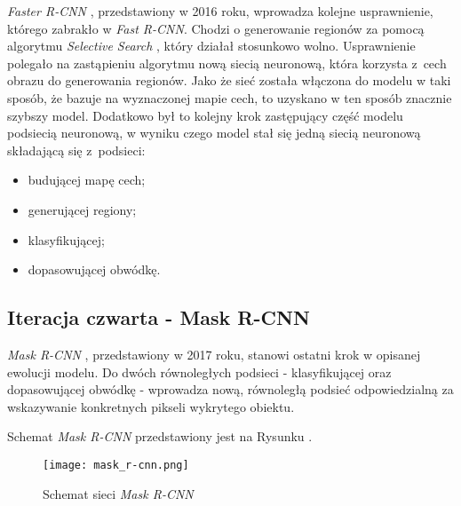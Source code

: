 
\textit{Faster R-CNN} \cite{faster-rcnn}, przedstawiony w 2016 roku, wprowadza kolejne usprawnienie, którego zabrakło w \textit{Fast R-CNN}.
Chodzi o generowanie regionów za pomocą algorytmu \textit{Selective Search} \cite{selective-search}, który działał stosunkowo wolno.
Usprawnienie polegało na zastąpieniu algorytmu nową siecią neuronową, która korzysta z~cech obrazu do generowania regionów.
Jako że sieć została włączona do modelu w taki sposób, że bazuje na wyznaczonej mapie cech, to uzyskano w ten sposób znacznie szybszy model.
Dodatkowo był to kolejny krok zastępujący część modelu podsiecią neuronową, w wyniku czego model stał się jedną siecią neuronową składającą się z~podsieci:

\begin{itemize}
	\item budującej mapę cech;
	\item generującej regiony;
	\item klasyfikującej;
	\item dopasowującej obwódkę.
\end{itemize}

\newpage
\subsection{Iteracja czwarta - Mask R-CNN}

\textit{Mask R-CNN} \cite{matterport-mask-rcnn}, przedstawiony w 2017 roku, stanowi ostatni krok w opisanej ewolucji modelu.
Do dwóch równoległych podsieci - klasyfikującej oraz dopasowującej obwódkę - wprowadza nową, równoległą podsieć odpowiedzialną za wskazywanie konkretnych pikseli wykrytego obiektu.

Schemat \textit{Mask R-CNN} przedstawiony jest na Rysunku .


\begin{figure}[h]
  \centering
  \caption{Schemat sieci \textit{Mask R-CNN}}
  \texttt{[image: mask\_r-cnn.png]}
  \label{fig:mask_r_cnn}
\end{figure}
